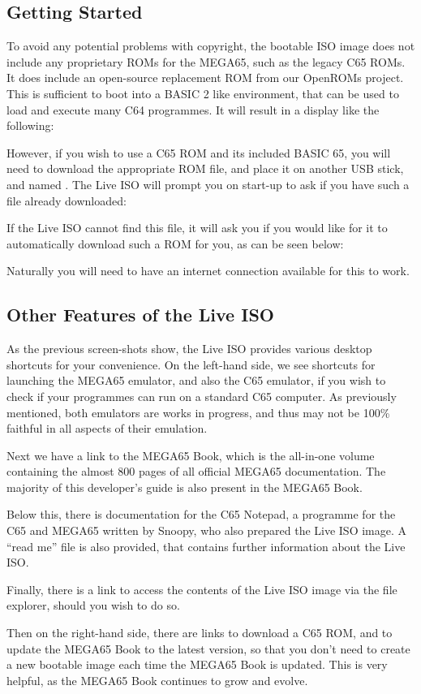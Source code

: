 \subsection{Getting Started}

To avoid any potential problems with copyright, the bootable ISO image does not
include any proprietary ROMs for the MEGA65, such as the legacy C65 ROMs.
It does include an open-source replacement ROM from our OpenROMs project.
This is sufficient to boot into a BASIC 2 like environment, that can be used
to load and execute many C64 programmes.  It will result in a display like the following:


However, if you wish to use a C65
ROM and its included BASIC 65, you will need to download the appropriate ROM file,
and place it on another USB stick, and named . The Live ISO
will prompt you on start-up to ask if you have such a file already downloaded:


If the Live ISO cannot find this file, it will ask you if you would like
for it to automatically download such a ROM for you, as can be seen below:


Naturally you will need to have an internet connection available for this to work.

\subsection{Other Features of the Live ISO}

As the previous screen-shots show, the Live ISO provides various desktop shortcuts
for your convenience.  On the left-hand side, we see shortcuts for launching the
MEGA65 emulator, and also the C65 emulator, if you wish to check if your programmes
can run on a standard C65 computer.  As previously mentioned, both emulators are
works in progress, and thus may not be 100\% faithful in all aspects of their emulation.

Next we have a link to the MEGA65 Book, which is the all-in-one volume containing the
almost 800 pages of all official MEGA65 documentation.
The majority of this developer's guide is also present in the MEGA65 Book.

Below this, there is documentation for the C65 Notepad, a programme for the C65 and MEGA65
written by Snoopy, who also prepared the Live ISO image.  A ``read me'' file is also provided,
that contains further information about the Live ISO.

Finally, there is a link to access the contents of the Live ISO image via the file
explorer, should you wish to do so.

Then on the right-hand side, there are links to download a C65 ROM, and to update the
MEGA65 Book to the latest version, so that you don't need to create a new bootable image
each time the MEGA65 Book is updated.  This is very helpful, as the MEGA65 Book continues
to grow and evolve.

